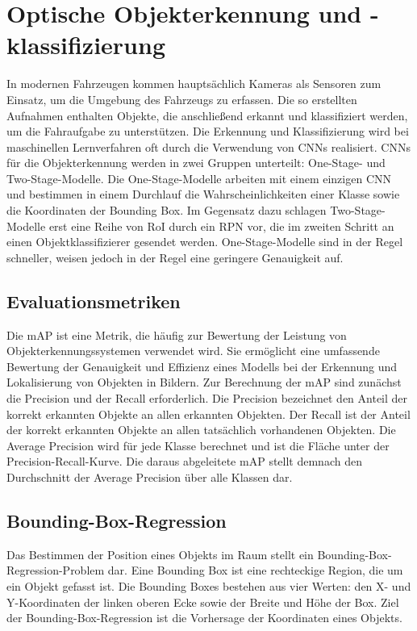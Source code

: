 \section{Optische Objekterkennung und -klassifizierung} \label{sec:literatur}

In modernen Fahrzeugen kommen hauptsächlich Kameras als Sensoren zum Einsatz, um die Umgebung des Fahrzeugs zu erfassen. Die so erstellten Aufnahmen enthalten Objekte, die anschließend erkannt und klassifiziert werden, um die Fahraufgabe zu unterstützen. Die Erkennung und Klassifizierung wird bei maschinellen Lernverfahren oft durch die Verwendung von \acp{CNN} realisiert. \acp{CNN} für die Objekterkennung werden in zwei Gruppen unterteilt: One-Stage- und Two-Stage-Modelle. Die One-Stage-Modelle arbeiten mit einem einzigen \ac{CNN} und bestimmen in einem Durchlauf die Wahrscheinlichkeiten einer Klasse sowie die Koordinaten der Bounding Box. \cite{DeLasHeras2021AdvancedDA} Im Gegensatz dazu schlagen Two-Stage-Modelle erst eine Reihe von \ac{RoI} durch ein \ac{RPN} vor, die im zweiten Schritt an einen Objektklassifizierer gesendet werden. One-Stage-Modelle sind in der Regel schneller, weisen jedoch in der Regel eine geringere Genauigkeit auf. \cite{accurateObjectDetection}

\subsection{Evaluationsmetriken}

Die \ac{mAP} ist eine Metrik, die häufig zur Bewertung der Leistung von Objekterkennungssystemen verwendet wird. Sie ermöglicht eine umfassende Bewertung der Genauigkeit und Effizienz eines Modells bei der Erkennung und Lokalisierung von Objekten in Bildern. Zur Berechnung der \ac{mAP} sind zunächst die Precision und der Recall erforderlich. Die Precision bezeichnet den Anteil der korrekt erkannten Objekte an allen erkannten Objekten. Der Recall ist der Anteil der korrekt erkannten Objekte an allen tatsächlich vorhandenen Objekten. Die Average Precision wird für jede Klasse berechnet und ist die Fläche unter der Precision-Recall-Kurve. Die daraus abgeleitete \ac{mAP} stellt demnach den Durchschnitt der Average Precision über alle Klassen dar. \cite{mAP} 

\subsection{Bounding-Box-Regression}

Das Bestimmen der Position eines Objekts im Raum stellt ein Bounding-Box-Regression-Problem dar. Eine Bounding Box ist eine rechteckige Region, die um ein Objekt gefasst ist. Die Bounding Boxes bestehen aus vier Werten: den X- und Y-Koordinaten der linken oberen Ecke sowie der Breite und Höhe der Box. Ziel der Bounding-Box-Regression ist die Vorhersage der Koordinaten eines Objekts. \cite{BoundingBoxRegression} 

